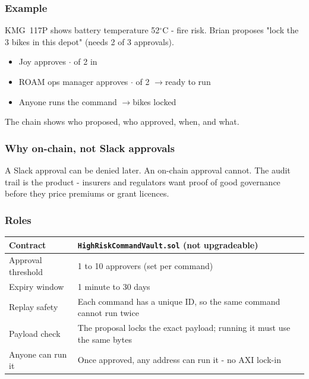 \documentclass[11pt,a4paper]{article}
\begin{document}
\subsubsection{Example}

\begin{scenariobox}[title=Mary's bike battery overheats]
KMG~117P shows battery temperature 52$^\circ$C - fire risk. Brian proposes "lock the 3 bikes in this depot" (needs 2 of 3 approvals).

\vspace{2pt}
\begin{itemize}[leftmargin=*, nosep]
  \item Joy approves \enspace$\cdot$ of 2 in
  \item ROAM ops manager approves \enspace$\cdot$ of 2 \enspace$\rightarrow$\enspace ready to run
  \item Anyone runs the command \enspace$\rightarrow$\enspace bikes locked
\end{itemize}

The chain shows who proposed, who approved, when, and what.
\end{scenariobox}

\subsubsection{Why on-chain, not Slack approvals}
A Slack approval can be denied later. An on-chain approval cannot. The audit trail is the product - insurers and regulators want proof of good governance before they price premiums or grant licences.

\subsubsection{Roles}

\begin{center}
\begin{tabular}{p{3.8cm} p{11.5cm}}
\toprule
{\bfseries\color{axiprimary}Contract} & \texttt{HighRiskCommandVault.sol} (\textbf{not upgradeable}) \\
\midrule
Approval threshold & 1 to 10 approvers (set per command) \\
Expiry window & 1 minute to 30 days \\
Replay safety & Each command has a unique ID, so the same command cannot run twice \\
Payload check & The proposal locks the exact payload; running it must use the same bytes \\
Anyone can run it & Once approved, any address can run it - no AXI lock-in \\
\bottomrule
\end{tabular}
\end{center}
\end{document}
